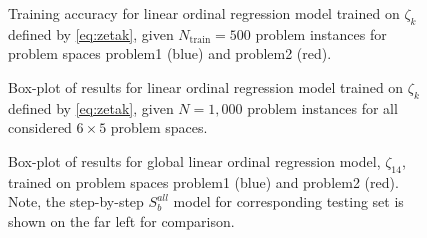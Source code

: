 \begin{figure}\centering
\caption{Training accuracy for linear ordinal regression model trained on $\zeta_k$ defined by \cref{eq:zetak}, given $N_{\text{train}}=500$ problem instances for problem spaces problem{1} (blue) and problem{2} (red).}
\label{fig:global:tracc}
\end{figure}

\begin{figure}\centering
\end{figure}

\begin{figure}\centering
\ContinuedFloat 
\end{figure}

\begin{figure} \centering
\ContinuedFloat 
\end{figure}

\begin{figure}\centering
\ContinuedFloat 
\end{figure}

\begin{figure}\centering
\ContinuedFloat 
\caption{Box-plot of results for linear ordinal regression model trained on $\zeta_k$ defined by \cref{eq:zetak}, given $N=1,000$ problem instances for all considered $6\times5$ problem spaces.}\label{fig:stepbystep:boxplot}
\end{figure}



\begin{figure}\centering
\caption{Box-plot of results for global linear ordinal regression model, $\zeta_{14}$, trained on problem spaces problem{1} (blue) and problem{2} (red). Note, the step-by-step $S_b^{all}$ model for corresponding testing set is shown on the far left for comparison.}
\label{fig:global}
\end{figure}

